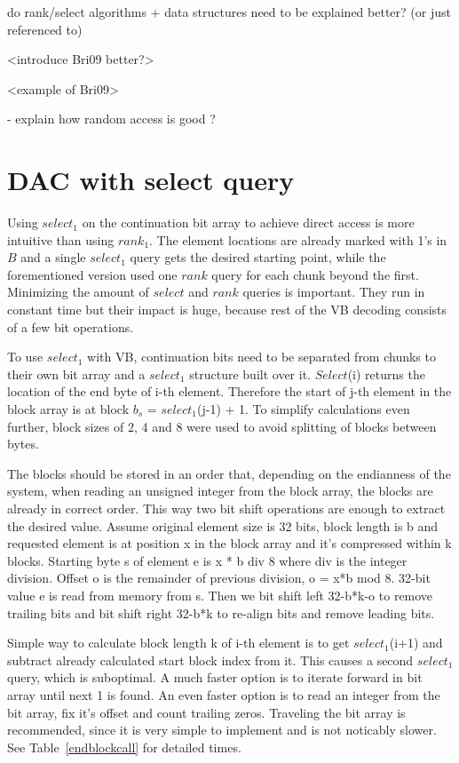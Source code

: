 do rank/select algorithms + data structures need to be explained better? (or just referenced to)

<introduce Bri09 better?>

<example of Bri09>

- explain how random access is good ?

\chapter{DAC with select query}

Using $select_1$ on the continuation bit array to achieve direct access is more intuitive than using $rank_1$. The element locations are already marked with 1's 
in $B$ and a single $select_1$ query gets the desired starting point, while the forementioned version \citep{Bri09} used one $rank$ query for each chunk beyond 
the first. Minimizing the amount of $select$ and $rank$ queries is important. They run in constant time but their impact is huge, because rest of the VB decoding 
consists of a few bit operations. 

To use $select_1$ with VB, continuation bits need to be separated from chunks to their own bit array and a $select_1$ structure built over it. $Select$(i) returns the
location of the end byte of i-th element. Therefore the start of j-th element in the block array is at block $b_s$ = $select_1$(j-1) + 1. To simplify calculations even further,
block sizes of 2, 4 and 8 were used to avoid splitting of blocks between bytes.

The blocks should be stored in an order that, depending on the endianness of the system, when reading an unsigned integer from the block array, the blocks are already 
in correct order. This way two bit shift operations are enough to extract the desired value.  Assume original element size is 32 bits, block length is b and requested
element is at position x in the block array and it's compressed within k blocks. Starting byte s of element e is x * b div 8 where div is the integer division. Offset o
is the remainder of previous division, o = x*b mod 8. 32-bit value e is read from memory from s. Then we bit shift left 32-b*k-o to remove trailing bits and bit shift right
32-b*k to re-align bits and remove leading bits. 

Simple way to calculate block length k of i-th element is to get $select_1$(i+1) and subtract already calculated start block index from it. This causes a second $select_1$
query, which is suboptimal. A much faster option is to iterate forward in bit array until next 1 is found. An even faster option is to read an integer from the bit array, fix
it's offset and count trailing zeros. Traveling the bit array is recommended, since it is very simple to implement and is not noticably slower. See Table~\ref{endblockcall} for 
detailed times.

